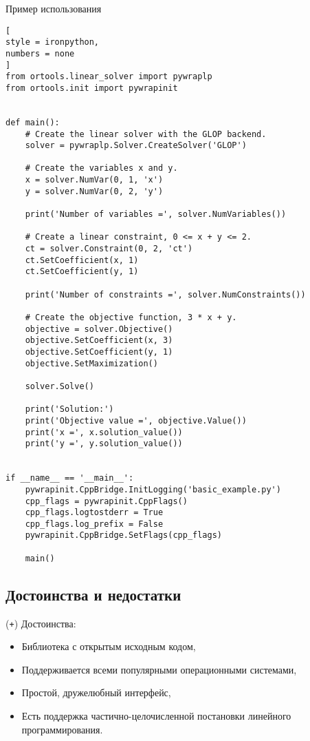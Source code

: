 \documentclass[%
	11pt,
	a4paper,
	utf8,
		]{article}
\begin{document}
Пример использования
\begin{lstlisting}[
style = ironpython,
numbers = none
]
from ortools.linear_solver import pywraplp
from ortools.init import pywrapinit


def main():
	# Create the linear solver with the GLOP backend.
	solver = pywraplp.Solver.CreateSolver('GLOP')

	# Create the variables x and y.
	x = solver.NumVar(0, 1, 'x')
	y = solver.NumVar(0, 2, 'y')

	print('Number of variables =', solver.NumVariables())

	# Create a linear constraint, 0 <= x + y <= 2.
	ct = solver.Constraint(0, 2, 'ct')
	ct.SetCoefficient(x, 1)
	ct.SetCoefficient(y, 1)

	print('Number of constraints =', solver.NumConstraints())

	# Create the objective function, 3 * x + y.
	objective = solver.Objective()
	objective.SetCoefficient(x, 3)
	objective.SetCoefficient(y, 1)
	objective.SetMaximization()

	solver.Solve()

	print('Solution:')
	print('Objective value =', objective.Value())
	print('x =', x.solution_value())
	print('y =', y.solution_value())


if __name__ == '__main__':
	pywrapinit.CppBridge.InitLogging('basic_example.py')
	cpp_flags = pywrapinit.CppFlags()
	cpp_flags.logtostderr = True
	cpp_flags.log_prefix = False
	pywrapinit.CppBridge.SetFlags(cpp_flags)

	main()
\end{lstlisting}

\subsection{Достоинства и недостатки}

(\texttt{+}) Достоинства:
\begin{itemize}
	\item Библиотека с открытым исходным кодом,

	\item Поддерживается всеми популярными операционными системами,

	\item Простой, дружелюбный интерфейс,

	\item Есть поддержка частично-целочисленной постановки линейного программирования.
\end{itemize}
\end{document}
